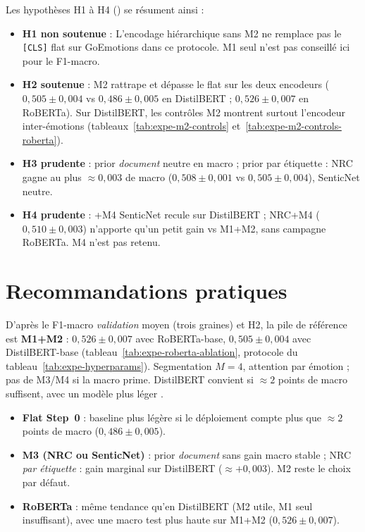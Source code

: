 Les hypothèses H1 à H4 () se résument
ainsi :
\begin{itemize}
\item \textbf{H1 non soutenue} : L'encodage hiérarchique sans M2 ne
      remplace pas le \texttt{[CLS]} flat sur GoEmotions dans ce
      protocole. M1 seul n'est pas conseillé ici pour le F1-macro.
\item \textbf{H2 soutenue} : M2 rattrape et dépasse le flat sur les deux
      encodeurs ($0{,}505 \pm 0{,}004$ vs $0{,}486 \pm 0{,}005$ en
      DistilBERT ; $0{,}526 \pm 0{,}007$ en RoBERTa). Sur DistilBERT,
      les contrôles M2 montrent surtout l'encodeur inter-émotions
      (tableaux~\ref{tab:expe-m2-controls} et~\ref{tab:expe-m2-controls-roberta}).
\item \textbf{H3 prudente} : prior \emph{document} neutre en macro ;
      prior par étiquette : NRC gagne au plus $\approx 0{,}003$ de macro
      ($0{,}508 \pm 0{,}001$ vs $0{,}505 \pm 0{,}004$), SenticNet neutre.
\item \textbf{H4 prudente} : +M4 SenticNet recule sur DistilBERT ;
      NRC+M4 ($0{,}510 \pm 0{,}003$) n'apporte qu'un petit gain vs M1+M2,
      sans campagne RoBERTa. M4 n'est pas retenu.
\end{itemize}

\section{Recommandations pratiques}
\label{sec:persp-recommandations}

D'après le F1-macro \emph{validation}
moyen (trois graines) et H2, la pile de référence est \textbf{M1+M2} :
$0{,}526 \pm 0{,}007$ avec RoBERTa-base, $0{,}505 \pm 0{,}004$ avec
DistilBERT-base (tableau~\ref{tab:expe-roberta-ablation}, protocole du
tableau~\ref{tab:expe-hyperparams}). Segmentation $M{=}4$, attention par
émotion ; pas de M3/M4 si la macro prime. DistilBERT convient si
$\approx 2$ points de macro suffisent, avec un modèle plus léger
\cite{sanh2019distilbert}.

\begin{itemize}
\item \textbf{Flat Step~0} : baseline plus légère si le déploiement
      compte plus que $\approx 2$ points de macro ($0{,}486 \pm 0{,}005$).
\item \textbf{M3 (NRC ou SenticNet)} : prior \emph{document} sans gain
      macro stable ; NRC \emph{par étiquette} : gain marginal sur
      DistilBERT ($\approx +0{,}003$). M2 reste le choix par défaut.
\item \textbf{RoBERTa} : même tendance qu'en DistilBERT (M2 utile, M1
      seul insuffisant), avec une macro test plus haute sur M1+M2
      ($0{,}526 \pm 0{,}007$).
\end{itemize}

